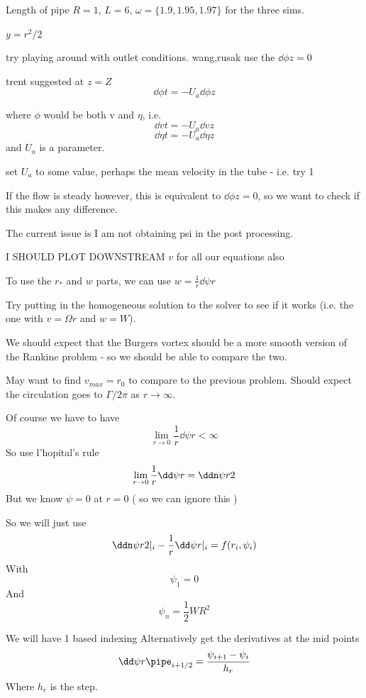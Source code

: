 \documentclass{X:/Documents/Coding/Latex/myreport}
\begin{document}
Length of pipe $R=1$, $L=6$, $\omega = \{1.9,1.95,1.97\}$ for the three sims.

$y = r^2/2$

try playing around with outlet conditions. wang,rusak use the $\dd \phi z = 0$

trent suggested at $z=Z$
\[\dd \phi t = -U_{a} \dd \phi z\]

where $\phi$ would be both v and $\eta$, i.e.
\[\dd vt = - U_{a} \dd v z\]
\[\dd\eta t = - U_{a} \dd \eta z\]
and $U_a$ is a parameter.

set $U_a$ to some value, perhaps the mean velocity in the tube - i.e. try 1

If the flow is steady however, this is equivalent to $\dd \phi z = 0$, so we want to check if this makes any difference.


The current issue is I am not obtaining psi in the post processing.



I SHOULD PLOT DOWNSTREAM $v$ for all our equations also



To use the $r_*$ and $w$ parts, we can use $w = \frac1r\dd\psi r $


Try putting in the homogeneous solution to the solver to see if it works (i.e. the one with $v = \Omega r$ and $w=W$).

We should expect that the Burgers vortex should be a more smooth version of the Rankine problem - so we should be able to compare the two.

May want to find $v_{max} = r_0$ to compare to the previous problem.
Should expect the circulation goes to $\Gamma / 2 \pi$ as $r\to \infty$.




Of course we have to have
\[\lim_{r\to 0} \frac1r \dd\psi r < \infty\]
So use l'hopital's rule
\[\lim_{r\to 0} \frac1r \dd\psi r = \ddn\psi r2\]
But we know $\psi = 0$ at $r=0$ ( so we can ignore this )



So we will just use
\[\ddn \psi r2 |_i - \frac1r \dd\psi r|_i = f(r_i,\psi_i)\]
With 
\[\psi_1 = 0\]
And
\[\psi_n = \frac12 WR^2\]

We will have 1 based indexing 
Alternatively 
get the derivatives at the mid points
\[\dd\psi r\pipe_{i+1/2} = \frac{\psi_{i+1} - \psi_i}{h_r}\]
Where $h_r$ is the step.
\end{document}
